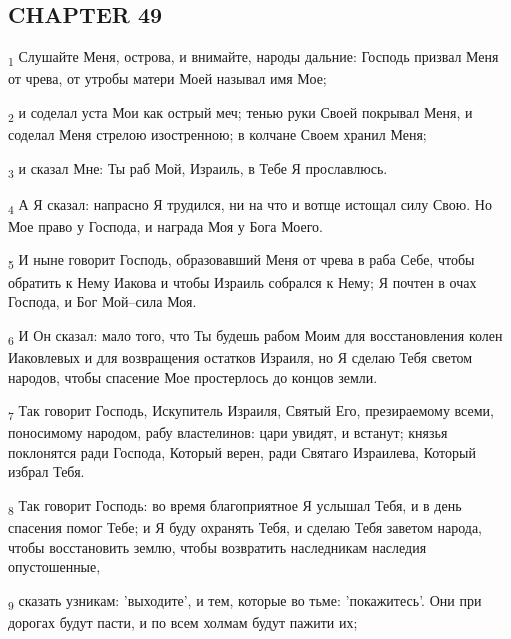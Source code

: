 \subsection{CHAPTER 49}
\begin{tcolorbox}
\textsubscript{1} Слушайте Меня, острова, и внимайте, народы дальние: Господь призвал Меня от чрева, от утробы матери Моей называл имя Мое;
\end{tcolorbox}
\begin{tcolorbox}
\textsubscript{2} и соделал уста Мои как острый меч; тенью руки Своей покрывал Меня, и соделал Меня стрелою изостренною; в колчане Своем хранил Меня;
\end{tcolorbox}
\begin{tcolorbox}
\textsubscript{3} и сказал Мне: Ты раб Мой, Израиль, в Тебе Я прославлюсь.
\end{tcolorbox}
\begin{tcolorbox}
\textsubscript{4} А Я сказал: напрасно Я трудился, ни на что и вотще истощал силу Свою. Но Мое право у Господа, и награда Моя у Бога Моего.
\end{tcolorbox}
\begin{tcolorbox}
\textsubscript{5} И ныне говорит Господь, образовавший Меня от чрева в раба Себе, чтобы обратить к Нему Иакова и чтобы Израиль собрался к Нему; Я почтен в очах Господа, и Бог Мой--сила Моя.
\end{tcolorbox}
\begin{tcolorbox}
\textsubscript{6} И Он сказал: мало того, что Ты будешь рабом Моим для восстановления колен Иаковлевых и для возвращения остатков Израиля, но Я сделаю Тебя светом народов, чтобы спасение Мое простерлось до концов земли.
\end{tcolorbox}
\begin{tcolorbox}
\textsubscript{7} Так говорит Господь, Искупитель Израиля, Святый Его, презираемому всеми, поносимому народом, рабу властелинов: цари увидят, и встанут; князья поклонятся ради Господа, Который верен, ради Святаго Израилева, Который избрал Тебя.
\end{tcolorbox}
\begin{tcolorbox}
\textsubscript{8} Так говорит Господь: во время благоприятное Я услышал Тебя, и в день спасения помог Тебе; и Я буду охранять Тебя, и сделаю Тебя заветом народа, чтобы восстановить землю, чтобы возвратить наследникам наследия опустошенные,
\end{tcolorbox}
\begin{tcolorbox}
\textsubscript{9} сказать узникам: 'выходите', и тем, которые во тьме: 'покажитесь'. Они при дорогах будут пасти, и по всем холмам будут пажити их;
\end{tcolorbox}

